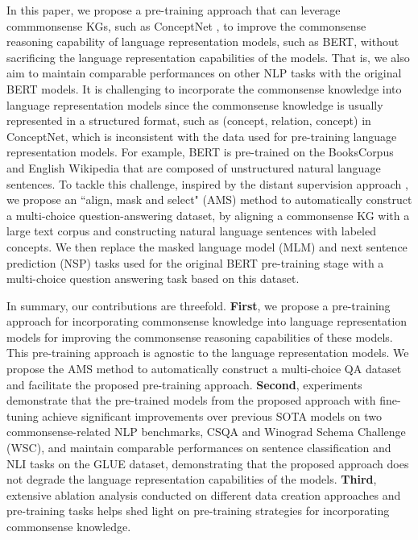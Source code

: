 \documentclass[11pt,a4paper]{article}
\begin{document}
In this paper, we propose a pre-training approach that can leverage commmonsense KGs, such as ConceptNet \citep{speer2017conceptnet}, to improve the commonsense reasoning capability of language representation models, such as BERT, without sacrificing the language representation capabilities of the models. 
That is, we also aim to maintain comparable performances on other NLP tasks with the original BERT models. 
It is challenging to incorporate the commonsense knowledge into language representation models since the commonsense knowledge is usually represented in a structured format, such as (concept, relation, concept) in ConceptNet, which is inconsistent with the data used for pre-training language representation models.
For example, BERT is pre-trained on the BooksCorpus and English Wikipedia that are composed of unstructured natural language sentences.
To tackle this challenge, inspired by the distant supervision approach \citep{mintz-etal-2009-distant}, we propose an ``align, mask and select" (AMS) method to automatically construct a multi-choice question-answering dataset, by aligning a commonsense KG with a large text corpus and constructing natural language sentences with labeled concepts. We then replace the masked language model (MLM) and next sentence prediction (NSP) tasks used for the original BERT pre-training stage with a multi-choice question answering task based on this dataset.




In summary, our contributions are threefold.
\textbf{First}, we propose a pre-training approach for incorporating commonsense knowledge into language representation models for improving the commonsense reasoning capabilities of these models. This pre-training approach is agnostic to the language representation models. We propose the AMS method to automatically construct a multi-choice QA dataset and facilitate the proposed pre-training approach.
\textbf{Second}, experiments demonstrate that the pre-trained models from the proposed approach with fine-tuning achieve significant improvements over previous SOTA models on two commonsense-related NLP benchmarks, CSQA and Winograd Schema Challenge (WSC), and maintain comparable performances on sentence classification and NLI tasks on the GLUE dataset, demonstrating that the proposed approach does not degrade the language representation capabilities of the models.
\textbf{Third}, extensive ablation analysis conducted on different data creation approaches and pre-training tasks helps shed light on pre-training strategies for incorporating commonsense knowledge.
\end{document}
